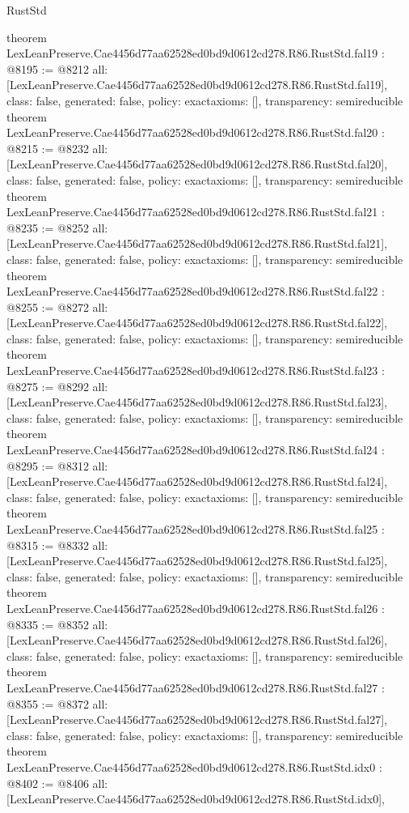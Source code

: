 \begin{lexlean}{RustStd}
\begin{coremodule}
{}
theorem LexLeanPreserve.Cae4456d77aa62528ed0bd9d0612cd278.R86.RustStd.fal19 : @8195 := @8212 {
  all: [LexLeanPreserve.Cae4456d77aa62528ed0bd9d0612cd278.R86.RustStd.fal19],
  class: false,
  generated: false,
  policy: exact{axioms: []},
  transparency: semireducible
}
theorem LexLeanPreserve.Cae4456d77aa62528ed0bd9d0612cd278.R86.RustStd.fal20 : @8215 := @8232 {
  all: [LexLeanPreserve.Cae4456d77aa62528ed0bd9d0612cd278.R86.RustStd.fal20],
  class: false,
  generated: false,
  policy: exact{axioms: []},
  transparency: semireducible
}
theorem LexLeanPreserve.Cae4456d77aa62528ed0bd9d0612cd278.R86.RustStd.fal21 : @8235 := @8252 {
  all: [LexLeanPreserve.Cae4456d77aa62528ed0bd9d0612cd278.R86.RustStd.fal21],
  class: false,
  generated: false,
  policy: exact{axioms: []},
  transparency: semireducible
}
theorem LexLeanPreserve.Cae4456d77aa62528ed0bd9d0612cd278.R86.RustStd.fal22 : @8255 := @8272 {
  all: [LexLeanPreserve.Cae4456d77aa62528ed0bd9d0612cd278.R86.RustStd.fal22],
  class: false,
  generated: false,
  policy: exact{axioms: []},
  transparency: semireducible
}
theorem LexLeanPreserve.Cae4456d77aa62528ed0bd9d0612cd278.R86.RustStd.fal23 : @8275 := @8292 {
  all: [LexLeanPreserve.Cae4456d77aa62528ed0bd9d0612cd278.R86.RustStd.fal23],
  class: false,
  generated: false,
  policy: exact{axioms: []},
  transparency: semireducible
}
theorem LexLeanPreserve.Cae4456d77aa62528ed0bd9d0612cd278.R86.RustStd.fal24 : @8295 := @8312 {
  all: [LexLeanPreserve.Cae4456d77aa62528ed0bd9d0612cd278.R86.RustStd.fal24],
  class: false,
  generated: false,
  policy: exact{axioms: []},
  transparency: semireducible
}
theorem LexLeanPreserve.Cae4456d77aa62528ed0bd9d0612cd278.R86.RustStd.fal25 : @8315 := @8332 {
  all: [LexLeanPreserve.Cae4456d77aa62528ed0bd9d0612cd278.R86.RustStd.fal25],
  class: false,
  generated: false,
  policy: exact{axioms: []},
  transparency: semireducible
}
theorem LexLeanPreserve.Cae4456d77aa62528ed0bd9d0612cd278.R86.RustStd.fal26 : @8335 := @8352 {
  all: [LexLeanPreserve.Cae4456d77aa62528ed0bd9d0612cd278.R86.RustStd.fal26],
  class: false,
  generated: false,
  policy: exact{axioms: []},
  transparency: semireducible
}
theorem LexLeanPreserve.Cae4456d77aa62528ed0bd9d0612cd278.R86.RustStd.fal27 : @8355 := @8372 {
  all: [LexLeanPreserve.Cae4456d77aa62528ed0bd9d0612cd278.R86.RustStd.fal27],
  class: false,
  generated: false,
  policy: exact{axioms: []},
  transparency: semireducible
}
theorem LexLeanPreserve.Cae4456d77aa62528ed0bd9d0612cd278.R86.RustStd.idx0 : @8402 := @8406 {
  all: [LexLeanPreserve.Cae4456d77aa62528ed0bd9d0612cd278.R86.RustStd.idx0],
}
\end{coremodule}
\end{lexlean}
